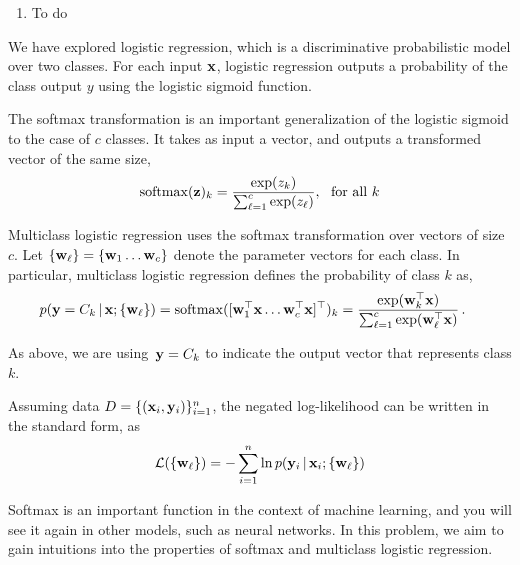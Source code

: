 \documentclass[submit]{harvardml}
\begin{document}
\begin{solution}
\begin{sol}
\begin{enumerate}
\item To do
\end{enumerate}
\end{sol}
\end{solution}


\newpage
\begin{problem}
%
  We have explored logistic regression, which is a discriminative
  probabilistic model over two classes. For each input $\mathbf{x}$,
  logistic regression outputs a probability of the class output $y$
  using the logistic sigmoid function.

  The softmax transformation is an important generalization of the logistic
  sigmoid to the case of $c$ classes. It takes as input a vector, and
  outputs a transformed vector of the same size,
%
  \[ \mathrm{softmax}(\mathbf{z})_k =\frac{\exp(z_k)}{\sum_{\ell=1}^c \exp(z_{\ell})}, \ \ \text{for all $k$}\]

Multiclass logistic regression uses the softmax transformation over vectors of size $c$. Let $\{\mathbf{w}_{\ell}\} = \{\mathbf{w}_1 \ldots \mathbf{w}_c \} $
denote the parameter vectors for each class.
In particular,  multiclass logistic regression 
defines the probability of class $k$ as,
%
\begin{align*}
  p(\mathbf{y}=C_k \,|\, \mathbf{x}; \{\mathbf{w}_{\ell}\})
  &= \mathrm{softmax}([\mathbf{w}_1^{\top}\mathbf{x} \ldots \mathbf{w}_c^{\top} \mathbf{x}]^\top)_k =  \frac{ \exp( \mathbf{w}_k^{\top}\mathbf{x} ) }
  {  \sum_{\ell=1}^c \exp( \mathbf{w}_{\ell}^{\top}\mathbf{x} ) }\,.
\end{align*}

\noindent  As above, we are
using~$\mathbf{y} = {C_{k}}$ to indicate the output 
vector that represents class $k$.

Assuming data $D = \{(\mathbf{x}_i, \mathbf{y}_i)\}_{i=1}^n$,
the negated log-likelihood  can be written in the standard form, as
%
\[\mathcal{L}(\{\mathbf{w}_{\ell}\}) = - \sum_{i=1}^n \ln  p(\mathbf{y}_i \,|\, \mathbf{x}_i; \{\mathbf{w}_{\ell}\}) \]


Softmax is an important function in the context of machine learning,
and you will see it again in other models, such as neural networks.
In this problem, we aim to gain intuitions into the properties of
softmax and multiclass logistic regression.


\end{problem}
\end{document}
